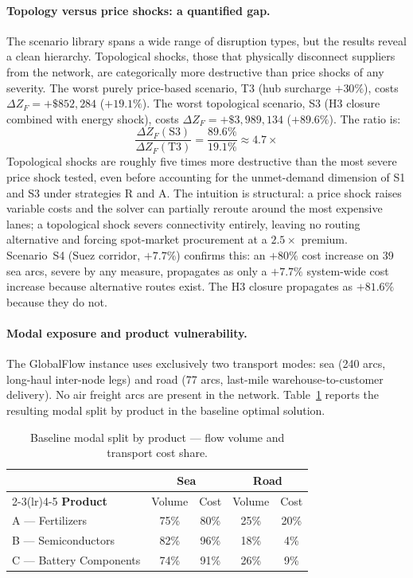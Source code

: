 \paragraph{Topology versus price shocks: a quantified gap.}
The scenario library spans a wide range of disruption types, but
the results reveal a clean hierarchy. Topological shocks,
those that physically disconnect suppliers from the network,
are categorically more destructive than price shocks of any
severity. The worst purely price-based scenario, T3 (hub
surcharge $+30\%$), costs $\Delta Z_F = +\$852{,}284$
($+19.1\%$). The worst topological scenario, S3 (H3 closure
combined with energy shock), costs
$\Delta Z_F = +\$3{,}989{,}134$ ($+89.6\%$). The ratio is:
\[
  \frac{\Delta Z_F(\text{S3})}{\Delta Z_F(\text{T3})}
  = \frac{89.6\%}{19.1\%} \approx 4.7\times
\]
Topological shocks are roughly five times more
destructive than the most severe price shock tested, even
before accounting for the unmet-demand dimension of S1 and S3
under strategies R and A. The intuition is structural: a price
shock raises variable costs and the solver can partially reroute
around the most expensive lanes; a topological shock severs
connectivity entirely, leaving no routing alternative and forcing
spot-market procurement at a $2.5\times$ premium. Scenario~S4
(Suez corridor, $+7.7\%$) confirms this: an $+80\%$ cost
increase on 39 sea arcs, severe by any measure, propagates
as only a $+7.7\%$ system-wide cost increase because alternative
routes exist. The H3 closure propagates as $+81.6\%$ because
they do not.
 
\paragraph{Modal exposure and product vulnerability.}
The GlobalFlow instance uses exclusively two transport modes:
sea (240 arcs, long-haul inter-node legs) and
road (77 arcs, last-mile warehouse-to-customer
delivery). No air freight arcs are present in the network.
Table~\ref{tab:modal_split} reports the resulting modal split
by product in the baseline optimal solution.
 
\begin{table}[H]
\centering
\caption{Baseline modal split by product — flow volume and
         transport cost share.}
\label{tab:modal_split}
\small
\begin{tabular}{@{}lcccc@{}}
\toprule
& \multicolumn{2}{c}{\textbf{Sea}} &
  \multicolumn{2}{c}{\textbf{Road}} \\
\cmidrule(lr){2-3}\cmidrule(lr){4-5}
\textbf{Product} & Volume & Cost & Volume & Cost \\
\midrule
A — Fertilizers        & 75\% & 80\% & 25\% & 20\% \\
B — Semiconductors     & 82\% & 96\% & 18\% &  4\% \\
C — Battery Components & 74\% & 91\% & 26\% &  9\% \\
\bottomrule
\end{tabular}
\end{table}
 
